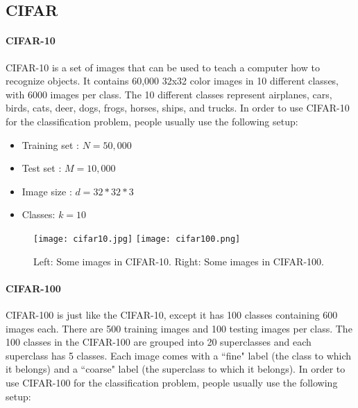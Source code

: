 {\break
\subsection{CIFAR}
\paragraph{CIFAR-10}
CIFAR-10\cite{krizhevsky2009learning} is a set of images that can be used to teach a computer how to recognize objects. It contains 60,000 32x32 color images in 10 different classes,  with 6000 images per class. The 10 different classes represent airplanes, cars, birds, cats, deer, dogs, frogs, horses, ships, and trucks. In order to use CIFAR-10 for the classification problem, people usually use the following setup:
\begin{itemize}
	\item Training set : $N = 50,000$
	\item Test set : $M = 10,000$
	\item Image size : $d  = 32*32*3$
	\item Classes: $k = 10$
\end{itemize}
\begin{figure}[H]
	\begin{center}
		\texttt{[image: cifar10.jpg]}
		\texttt{[image: cifar100.png]}
		\label{Fig: CIFAR-10}
		\caption{Left: Some images in CIFAR-10. Right: Some images in CIFAR-100.}
	\end{center}
\end{figure}


\break

\paragraph{CIFAR-100}
CIFAR-100\cite{krizhevsky2009learning} is just like the CIFAR-10, except it has 100 classes containing 600 images each. There are 500 training images and 100 testing images per class. The 100 classes in the CIFAR-100 are grouped into 20 superclasses and each superclass has 5 classes. Each image comes with a ``fine" label (the class to which it belongs) and a ``coarse" label (the superclass to which it belongs). In order to use CIFAR-100 for the classification problem, people usually use the following setup:

}
